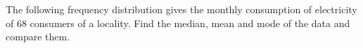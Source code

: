\begin{flushleft}
The following frequency distribution gives the monthly consumption of electricity of
68 consumers of a locality. Find the median, mean and mode of the data and compare
them.
\end{flushleft}

\begin{table}[ht!]
\centering

\end{table} 
